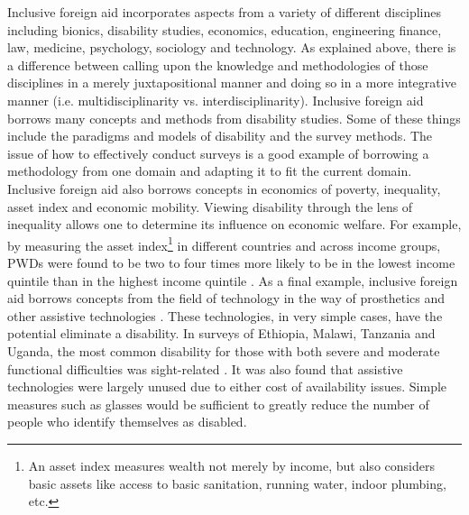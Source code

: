 \documentclass[a4paper]{article}
\begin{document}
Inclusive foreign aid incorporates aspects from a variety of different
disciplines including bionics, disability studies, economics, education,
engineering finance, law, medicine, psychology, sociology and technology. As
explained above, there is a difference between calling upon the knowledge and
methodologies of those disciplines in a merely juxtapositional manner and
doing so in a more integrative manner (i.e. multidisciplinarity vs.
interdisciplinarity). Inclusive foreign aid borrows many concepts and methods
from disability studies. Some of these things include the paradigms and models
of disability and the survey methods. The issue of how to effectively conduct
surveys is a good example of borrowing a methodology from one domain and
adapting it to fit the current domain. Inclusive foreign aid also borrows
concepts in economics of poverty, inequality, asset index and economic
mobility. Viewing disability through the lens of inequality allows one to
determine its influence on economic welfare. For example, by measuring the
asset index\footnote{An asset index measures wealth not merely by income, but
    also considers basic assets like access to basic sanitation, running
water, indoor plumbing, etc.} in different countries and across income groups,
PWDs were found to be two to four times more likely to be in the lowest income
quintile than in the highest income quintile \citep{mitra2018disability}. As a
final example, inclusive foreign aid borrows concepts from the field of
technology in the way of prosthetics and other assistive technologies
\citep{roulstone2016disability}. These technologies, in very simple cases,
have the potential eliminate a disability. In surveys of Ethiopia, Malawi,
Tanzania and Uganda, the most common disability for those with both severe and
moderate functional difficulties was sight-related
\citep{mitra2018disability}. It was also found that assistive technologies
were largely unused due to either cost of availability issues. Simple measures
such as glasses would be sufficient to greatly reduce the number of people who
identify themselves as disabled.



\end{document}
